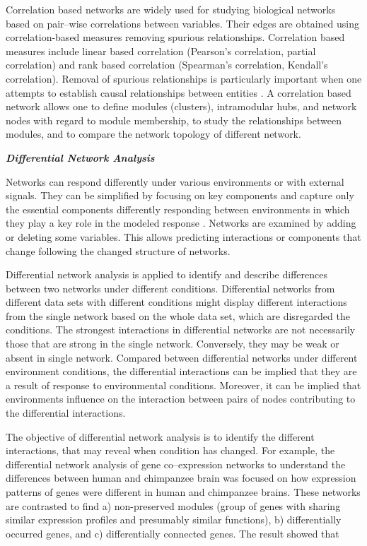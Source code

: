 \documentclass[12pt, oneside]{report}
\begin{document}
Correlation based networks are widely used for studying biological networks based on pair--wise correlations between variables. Their edges are obtained using correlation-based measures removing spurious relationships. Correlation based measures include linear based correlation (Pearson's correlation, partial correlation) and rank based correlation (Spearman's correlation, Kendall's correlation). Removal of spurious relationships is particularly important when one attempts to establish causal relationships between entities \citep{Toubiana:2013cv}. A correlation based network allows one to define modules (clusters), intramodular hubs, and network nodes with regard to module membership, to study the relationships between modules, and to compare the network topology of different network. 

\textbf{\textit{Differential Network Analysis}}

Networks can respond differently under various environments or with external signals. They can be simplified by focusing on key components and capture only the essential components differently responding between environments in which they play a key role in the modeled response \citep{Peer:2011jd}. Networks are examined by adding or deleting some variables. This allows predicting interactions or components that change following the changed structure of networks. 

Differential network analysis is applied to identify and describe differences between two networks under different conditions. Differential networks from different data sets with different conditions might display different interactions from the single network based on the whole data set, which are disregarded the conditions. The strongest interactions in differential networks are not necessarily those that are strong in the single network. Conversely, they may be weak or absent in single network. Compared between differential networks under different environment conditions, the differential interactions can be implied that they are a result of response to environmental conditions. Moreover, it can be implied that environments influence on the interaction between pairs of nodes contributing to the differential interactions. 

The objective of differential network analysis is to identify the different interactions, that may reveal when condition has changed. For example, the differential network analysis of gene co--expression networks to understand the differences between human and chimpanzee brain was focused on how expression patterns of genes were different in human and chimpanzee brains. These networks are contrasted to find a) non-preserved modules (group of genes with sharing similar expression profiles and presumably similar functions), b) differentially occurred genes, and c) differentially connected genes. The result showed that 
\end{document}
